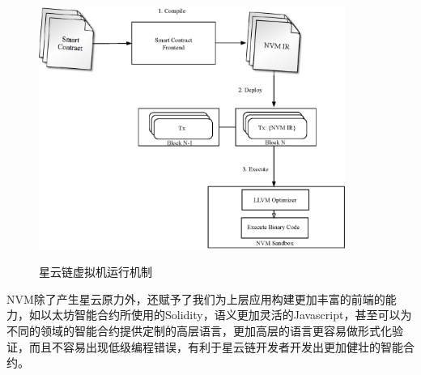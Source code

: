 \begin{figure}[h]
\centering
\includegraphics[width=10cm]{./figs/nvm-process}
\label{fig:nvm-process}
\caption{星云链虚拟机运行机制}
\end{figure}

NVM除了产生星云原力外，还赋予了我们为上层应用构建更加丰富的前端的能力，如以太坊智能合约所使用的Solidity，语义更加灵活的Javascript，甚至可以为不同的领域的智能合约提供定制的高层语言，更加高层的语言更容易做形式化验证，而且不容易出现低级编程错误，有利于星云链开发者开发出更加健壮的智能合约。